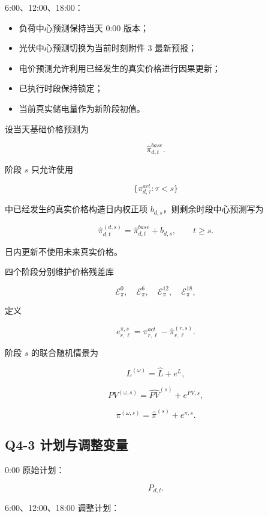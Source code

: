 6:00、12:00、18:00：

\begin{itemize}
\item 负荷中心预测保持当天 0:00 版本；
\item 光伏中心预测切换为当前时刻附件 3 最新预报；
\item 电价预测允许利用已经发生的真实价格进行因果更新；
\item 已执行时段保持锁定；
\item 当前真实储电量作为新阶段初值。
\end{itemize}

设当天基础价格预测为

\[
\hat\pi_{d,t}^{base}.
\]

阶段 \(s\) 只允许使用

\[
\{\pi^{act}_{d,\tau}:\tau<s\}
\]

中已经发生的真实价格构造日内校正项 \(b_{d,s}\)，则剩余时段中心预测写为

\begin{equation}
\hat\pi_{d,t}^{(d,s)}
=
\hat\pi_{d,t}^{base}
+
b_{d,s},
\qquad
t\ge s.
\end{equation}

日内更新不使用未来真实价格。

四个阶段分别维护价格残差库

\[
\mathcal E_\pi^0,\quad
\mathcal E_\pi^6,\quad
\mathcal E_\pi^{12},\quad
\mathcal E_\pi^{18},
\]

定义

\begin{equation}
e^{\pi,s}_{r,\ell}
=
\pi^{act}_{r,\ell}
-
\hat\pi^{(r,s)}_{r,\ell}.
\end{equation}

阶段 \(s\) 的联合随机情景为

\[
L^{(\omega)}
=
\hat L+e^L,
\]

\[
PV^{(\omega,s)}
=
\widehat{PV}^{(s)}
+
e^{PV,s},
\]

\begin{equation}
\pi^{(\omega,s)}
=
\hat\pi^{(s)}
+
e^{\pi,s}.
\end{equation}

\subsection{Q4-3 计划与调整变量}

0:00 原始计划：

\[
P_{d,t}.
\]

6:00、12:00、18:00 调整计划：

